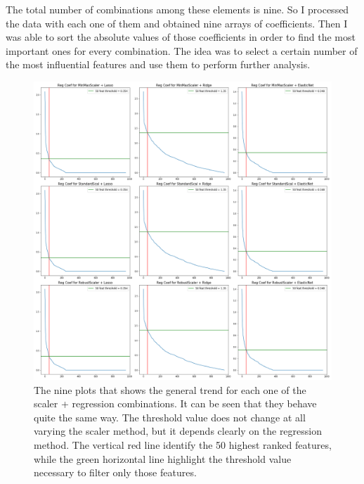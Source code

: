 \documentclass[12pt]{article}
\begin{document}
The total number of combinations among these elements is nine. So I processed the data with each one of them and obtained nine arrays of coefficients. Then I was able to sort the absolute values of those coefficients in order to find the most important ones for every combination. The idea was to select a certain number of the most influential features and use them to perform further analysis.

\begin{figure}
  \includegraphics[width=\linewidth]{NineCoefPlot.png}
  \caption{The nine plots that shows the general trend for each one of the scaler + regression combinations. It can be seen that they behave quite the same way. The threshold value does not change at all varying the scaler method, but it depends clearly on the regression method. The vertical red line identify the 50 highest ranked features, while the green horizontal line highlight the threshold value necessary to filter only those features.}
  \label{fig:boat1}
\end{figure}
\end{document}
